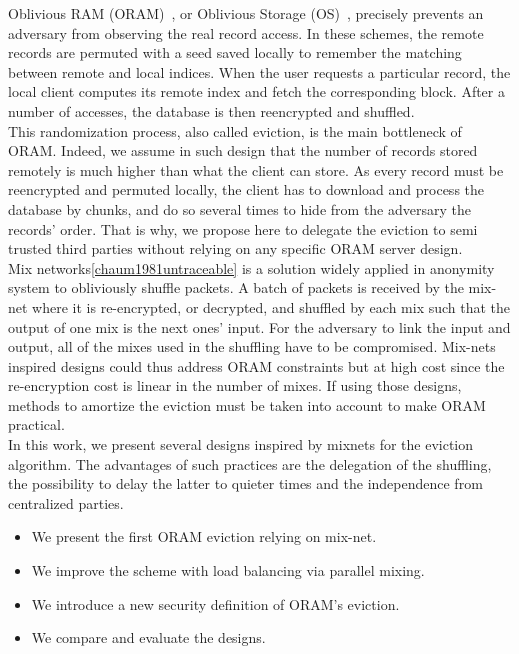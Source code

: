 \documentclass{llncs}
\begin{document}
Oblivious RAM (ORAM)~\cite{goldreich87}, or Oblivious Storage (OS)~\cite{boneh2011}, precisely prevents an adversary from observing the real record access. In these schemes, the remote records are permuted with a seed saved locally to remember the matching between remote and local indices. When the user requests a particular record, the local client  computes its remote index and fetch the corresponding block. After a number of accesses, the database is then reencrypted and shuffled.\\ 
This randomization process, also called eviction, is the main bottleneck of ORAM. Indeed, we assume in such design that the number of records stored remotely is much higher than what the client can store. As every record must be reencrypted and permuted locally, the client has to download and process the database by chunks, and do so several times to hide from the adversary the records' order. That is why, we propose here to delegate the eviction to semi trusted third parties without relying on any specific ORAM server design.\\
Mix networks\ref{chaum1981untraceable} is a solution widely applied in anonymity system to obliviously shuffle packets. A batch of packets is received by the mix-net where it is re-encrypted, or decrypted, and shuffled by each mix such that the output of one mix is the next ones' input. For the adversary to link the input and output, all of the mixes used in the shuffling have to be compromised.
Mix-nets inspired designs could thus address ORAM constraints but at high cost since the re-encryption cost is linear in the number of mixes. If using those designs, methods to amortize the eviction must be taken into account to make ORAM practical.\\

In this work, we present several designs inspired by mixnets for the eviction algorithm.
The advantages of such practices are the delegation of the shuffling, the possibility to delay the latter to quieter times and the independence from centralized parties.

\begin{itemize}
 \item We present the first ORAM eviction relying on mix-net.
 \item We improve the scheme with load balancing via parallel mixing.
 \item We introduce a new security definition of ORAM's eviction. %
 \item We compare and evaluate the designs.
\end{itemize}
\end{document}
